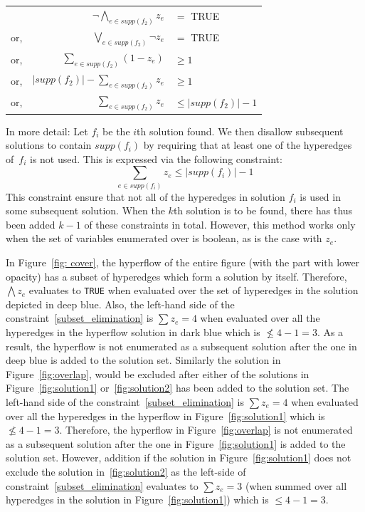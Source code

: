 \begin{center}
\begin{tabular}{lrl}
    & $\neg \bigwedge_{e\in supp(f_2)} z_e$ & $=$ TRUE\\
    or,& $\bigvee_{e\in supp(f_2)} \neg z_e$ & $=$ TRUE\\
    or,& $\sum_{e\in supp(f_2)} (1 - z_e)$ & $\geq 1$\\
    or,& $|supp(f_2)| - \sum_{e\in supp(f_2)} z_e$ & $\geq 1$\\
    or,& $\sum_{e\in supp(f_2)} z_e$ & $\leq |supp(f_2)| - 1$
\end{tabular}
\end{center}

In more detail: Let $f_i$ be the $i$th solution found. 
We then disallow subsequent solutions to contain $supp(f_i)$ by requiring that at least one of the hyperedges of~$f_i$ is not used. This is expressed via the following constraint:
\begin{equation}
    \sum_{e\in supp(f_i)} z_e \leq |supp(f_i)| - 1
    \label{subset_elimination}
\end{equation}
This constraint ensure that not all of the hyperedges in solution $f_i$ is used in some subsequent solution.
When the $k$th solution is to be found, there has thus been added $k-1$ of these constraints in total.
However, this method works only when the set of variables enumerated over is boolean, as is the case with $z_e$.

In Figure~\ref{fig: cover}, the hyperflow of the entire figure (with the part with lower opacity) has a subset of hyperedges which form a solution by itself. Therefore, $\bigwedge z_e$ evaluates to \texttt{TRUE} when evaluated over the set of hyperedges in the solution depicted in deep blue. Also, the left-hand side of the constraint~\eqref{subset_elimination} is $\sum z_e = 4$ when evaluated over all the hyperedges in the hyperflow solution in dark blue which is $\nleq 4-1 = 3$. As a result, the hyperflow is not enumerated as a subsequent solution after the one in deep blue is added to the solution set.
Similarly the solution in Figure~\ref{fig:overlap}, would be excluded after either of the solutions in Figure~\ref{fig:solution1} or~\ref{fig:solution2} has been added to the solution set. The left-hand side of the constraint~\eqref{subset_elimination} is $\sum z_e = 4$ when evaluated over all the hyperedges in the hyperflow in Figure~\ref{fig:solution1} which is $\nleq 4-1 = 3$. Therefore, the hyperflow in Figure~\ref{fig:overlap} is not enumerated as a subsequent solution after the one in Figure~\ref{fig:solution1} is added to the solution set. However, addition if the solution in Figure~\ref{fig:solution1} does not exclude the solution in~\ref{fig:solution2} as the left-side of constraint~\eqref{subset_elimination} evaluates to $\sum z_e = 3$ (when summed over all hyperedges in the solution in Figure~\ref{fig:solution1}) which is $\leq 4-1 = 3$.

